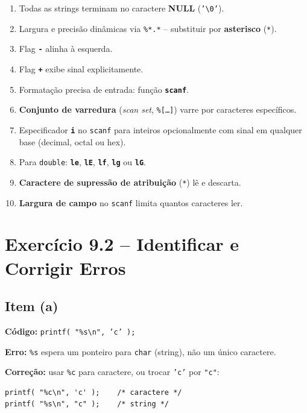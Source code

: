 \documentclass[12pt,a4paper]{article}
\begin{document}
\begin{respostabox}
\begin{enumerate}[label=\textbf{\alph*)}]
\item Todas as strings terminam no caractere \textbf{NULL} (\texttt{'\textbackslash 0'}).
\item Largura e precisão dinâmicas via \texttt{\%*.*} -- substituir por
\textbf{asterisco} (\texttt{*}).
\item Flag \textbf{\texttt{-}} alinha à esquerda.
\item Flag \textbf{\texttt{+}} exibe sinal explicitamente.
\item Formatação precisa de entrada: função \textbf{\texttt{scanf}}.
\item \textbf{Conjunto de varredura} (\textit{scan set}, \texttt{\%[\ldots]})
varre por caracteres específicos.
\item Especificador \textbf{\texttt{i}} no \texttt{scanf} para inteiros opcionalmente
com sinal em qualquer base (decimal, octal ou hex).
\item Para \texttt{double}: \textbf{\texttt{le}}, \textbf{\texttt{lE}},
\textbf{\texttt{lf}}, \textbf{\texttt{lg}} ou \textbf{\texttt{lG}}.
\item \textbf{Caractere de supressão de atribuição} (\texttt{*}) lê e descarta.
\item \textbf{Largura de campo} no \texttt{scanf} limita quantos caracteres ler.
\end{enumerate}
\end{respostabox}

\newpage

\section{Exercício 9.2 -- Identificar e Corrigir Erros}

\subsection*{Item (a)}
\begin{respostabox}
\textbf{Código:} \texttt{printf( "\%s\textbackslash n", 'c' );}

\textbf{Erro:} \texttt{\%s} espera um ponteiro para \texttt{char} (string), não
um único caractere.

\textbf{Correção:} usar \texttt{\%c} para caractere, ou trocar \texttt{'c'} por \texttt{"c"}:
\begin{lstlisting}
printf( "%c\n", 'c' );    /* caractere */
printf( "%s\n", "c" );    /* string */
\end{lstlisting}
\end{respostabox}
\end{document}
